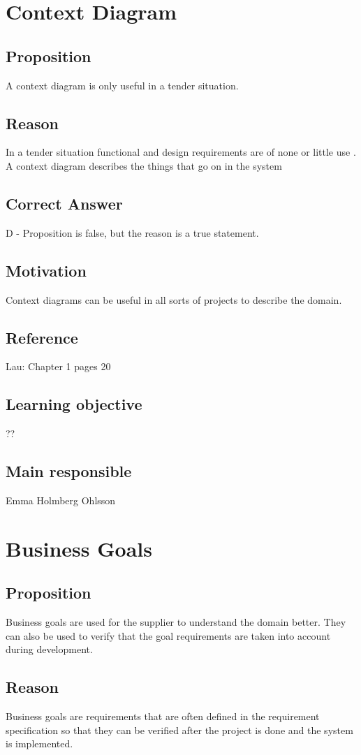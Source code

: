 \documentclass[a4paper]{article}
\begin{document}
\section{Context Diagram}
\subsection{Proposition}
A context diagram is only useful in a tender situation.
\subsection{Reason}
In a tender situation functional and design requirements are of none or little use . A context diagram describes the things that go on in the system
\subsection{Correct Answer}
D - Proposition is false, but the reason is a true statement.
\subsection{Motivation}
Context diagrams can be useful in all sorts of projects to describe the domain.
\subsection{Reference}
Lau: Chapter 1 pages 20
\subsection{Learning objective}
??
\subsection{Main responsible}
Emma Holmberg Ohlsson



\section{Business Goals}
\subsection{Proposition}
Business goals are used for the supplier to understand the domain better. They can also be used to verify that the goal requirements are taken into account during development.
\subsection{Reason}
Business goals are requirements that are often defined in the requirement specification so that they can be verified after the project is done and the system is implemented.
\end{document}
